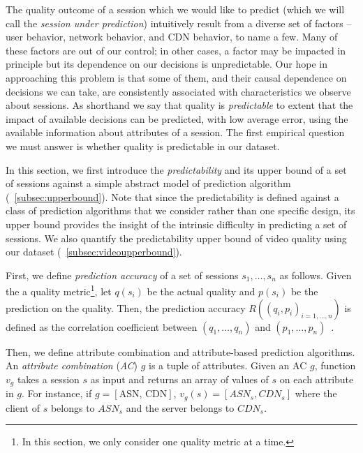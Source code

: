 \label{predictability}


The quality outcome of a session which we would like to predict (which we will call the {\it session under prediction}) intuitively result from a diverse set of factors -- user behavior, network behavior, and CDN behavior, to name a few.  Many of these factors are out of our control; in other cases, a factor may be impacted in principle but its dependence on our decisions is unpredictable.  Our hope in approaching this problem is that some of them, and their causal dependence on decisions we can take, are consistently associated with characteristics we observe about sessions.  As shorthand we say that quality is {\it predictable} to extent that the impact of available decisions can be predicted, with low average error, using the available information about attributes of a session.  The first empirical question we must answer is whether quality is predictable in our dataset. 

In this section, we first introduce the {\it predictability} and its upper bound of a set of sessions against a simple abstract model of prediction algorithm (\Section~\ref{subsec:upperbound}). Note that since the predictability is defined against a class of prediction algorithms that we consider rather than one specific design, its upper bound provides the insight of the intrinsic difficulty in predicting a set of sessions. We also quantify the predictability upper bound of video quality using our dataset (\Section~\ref{subsec:videoupperbound}). 


\label{subsec:upperbound}

First, we define {\it prediction accuracy} of a set of sessions $s_1,\dots,s_n$ as follows. Given the a quality metric\footnote{In this section, we only consider one quality metric at a time.}, let $q(s_i)$ be the actual quality and $p(s_i)$ be the prediction on the quality. Then, the prediction accuracy $R((q_i,p_i)_{i=1,\dots,n})$ is defined as the correlation coefficient between $(q_1,\dots,q_n)$ and $(p_1,\dots,p_n)$~\cite{?}.

Then, we define attribute combination and attribute-based prediction algorithms.
An {\it attribute combination} ({\it AC}) $g$ is a tuple of attributes. Given an AC $g$, function $v_g$ takes a session $s$ as input and returns an array of values of $s$ on each attribute in $g$. For instance, if $g=[\textrm{ASN, CDN}]$, $v_g(s)=[ASN_s,CDN_s]$ where the client of $s$ belongs to $ASN_s$ and the server belongs to $CDN_s$.

